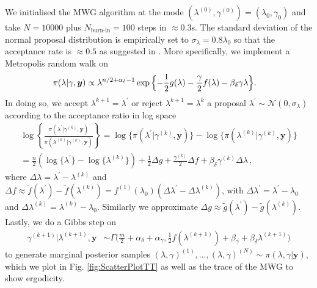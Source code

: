 We initialised the MWG algorithm at the mode $(\lambda^{(0)} , \gamma^{(0)}  ) = ( \lambda_{0} , \gamma_{0}  )$ and take $N = 10000$ plus $N_{\text{burn-in}} = 100$ steps in $\approx 0.3$s.
The standard deviation of the normal proposal distribution is empirically set to $\sigma_{\lambda} = 0.8 \lambda_0$ so that the acceptance rate is $\approx 0.5$ as suggested in \cite{robertsLecNot}.
More specifically, we implement a Metropolis random walk on
\begin{align}
	\label{eq:margApplCondGam}
	\pi(\lambda | \gamma, \bm{y}) &\propto \lambda^{n/2 +\alpha_{\delta}-1} \exp{\Bigl\{ - \frac{1}{2} g ( \lambda) - \frac{\gamma}{2} f ( \lambda) - \beta_\delta \gamma \lambda \Bigr\}}.
\end{align} 
In doing so, we accept $\lambda^{k+1} = \lambda^{\prime} $ or reject $\lambda^{k+1} = \lambda^{k} $  a proposal $\lambda^{\prime} \sim \mathcal{N}(0, \sigma_{\lambda})$ according to the acceptance ratio in log space
\begin{align} 
	\log \left\{ \frac{\pi(\lambda^{\prime} | \gamma^{(k)}, \bm{y})  }{\pi(\lambda^{(k)}| \gamma^{(k)}, \bm{y})}  \right\} 
	= \log  \{\pi(\lambda^{\prime} | \gamma^{(k)}, \bm{y} ) \}  -\log  \{ \pi(\lambda^{(k)}| \gamma^{(k)}, \bm{y}) \} \\
	= \frac{n}{2} (\log\{\lambda^{\prime}\} - \log\{\lambda^{(k)}\} ) + \frac{1}{2} \Delta g + \frac{\gamma^{(k)}}{2} \Delta f  + \beta_\delta \gamma^{(k)} \Delta \lambda  \, ,
\end{align}
where $\Delta \lambda = \lambda^{\prime} - \lambda^{(k)} $ and  $\Delta f \approx \tilde{f}(\lambda^\prime) - \tilde{f}(\lambda^{(k)}) =  f^{(1)} (\lambda_0) (\Delta \lambda^\prime - \Delta \lambda^{(k)}) $, with  $\Delta \lambda^{\prime} = \lambda^\prime - \lambda_0 $ and $\Delta \lambda^{(k)} =  \lambda^{(k)} - \lambda_0$.
Similarly we approximate $\Delta g \approx \tilde{g}(\lambda^{\prime}) -\tilde{g}(\lambda^{(k)})$.
Lastly, we do a Gibbs step on
\begin{align}
	\gamma^{(k+1)} |  \lambda^{(k+1)}, \bm{y} &\sim \Gamma \bigg( \frac{m}{2} + \alpha_\delta + \alpha_\gamma, \frac{1}{2} f (\lambda^{(k+1)}) + \beta_\gamma + \beta_\delta \lambda^{(k+1)} \bigg)\label{eq:GibbsStep}
\end{align} 
to generate marginal posterior samples $(\lambda, \gamma)^{(1)}, \dots, (\lambda, \gamma)^{(N)} \sim  \pi(\lambda, \gamma| \bm{y})$, which we plot in Fig. \ref{fig:ScatterPlotTT} as well as the trace of the MWG to show ergodicity.
%
